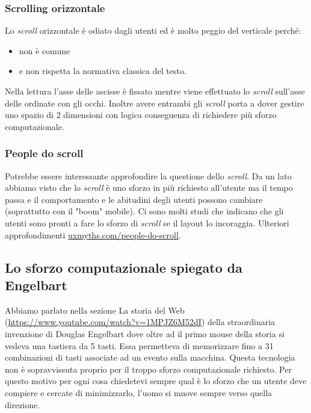			\subsubsection{Scrolling orizzontale}
				Lo \emph{scroll} orizzontale è odiato dagli utenti ed è molto peggio del verticale perché:
				\begin{itemize}
					\item non è comune
					\item e non rispetta la normativa classica del testo.	
				\end{itemize}
				Nella lettura l'asse delle ascisse è fissato mentre viene effettuato lo \emph{scroll} sull'asse delle ordinate con gli occhi. Inoltre avere entrambi gli \emph{scroll} porta a dover gestire uno spazio di 2 dimensioni con logica conseguenza di richiedere più sforzo computazionale.
			
			\subsubsection{People do scroll}
				Potrebbe essere interessante approfondire la questione dello \emph{scroll}. Da un lato abbiamo visto che lo \emph{scroll} è uno sforzo in più richiesto all'utente ma il tempo passa e il comportamento e le abitudini degli utenti possono cambiare (soprattutto con il "boom" mobile). Ci sono molti studi che indicano che gli utenti sono pronti a fare lo sforzo di \emph{scroll} se il layout lo incoraggia. Ulteriori approfondimenti \href{http://it.uxmyths.com/post/28647124262/mito-3-le-persone-non-scrollano}{uxmyths.com/people-do-scroll}.
				
		\subsection{Lo sforzo computazionale spiegato da Engelbart}
			Abbiamo parlato nella sezione La storia del Web (\url{https://www.youtube.com/watch?v=1MPJZ6M52dI}) della straordinaria invenzione di Douglas Engelbart dove oltre ad il primo mouse della storia si vedeva una tastiera da 5 tasti. Essa permetteva di memorizzare fino a 31 combinazioni di tasti associate ad un evento sulla macchina. Questa tecnologia non è sopravvissuta proprio per il troppo sforzo computazionale richiesto. Per questo motivo per ogni cosa chiedetevi sempre qual è lo sforzo che un utente deve compiere e cercate di minimizzarlo, l'uomo si muove sempre verso quella direzione.
		
